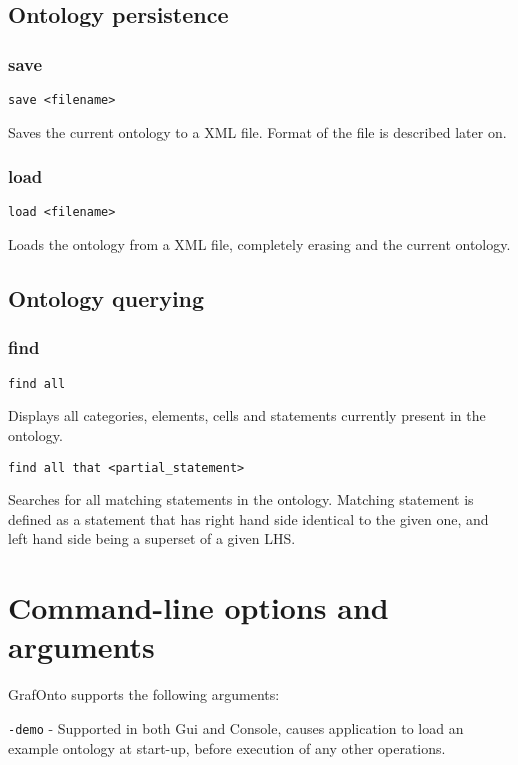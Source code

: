 \documentclass{article}
\begin{document}
\newpage

\subsection{Ontology persistence}

\subsubsection{save}
\begin{verbatim}
save <filename>
\end{verbatim}
Saves the current ontology to a XML file. Format of the file is described later on.

\subsubsection{load}
\begin{verbatim}
load <filename>
\end{verbatim}
Loads the ontology from a XML file, completely erasing and the current ontology.

\subsection{Ontology querying}
\subsubsection{find}
\begin{verbatim}
find all
\end{verbatim}
Displays all categories, elements, cells and statements currently present in the ontology.

\begin{verbatim}
find all that <partial_statement>
\end{verbatim}
Searches for all matching statements in the ontology. Matching statement is defined as
a statement that has right hand side identical to the given one, and left hand side being 
a superset of a given LHS.

\newpage

\section{Command-line options and arguments}
GrafOnto supports the following arguments:

\verb|-demo| - Supported in both Gui and Console, causes application to load an example ontology at
start-up, before execution of any other operations.
\end{document}
